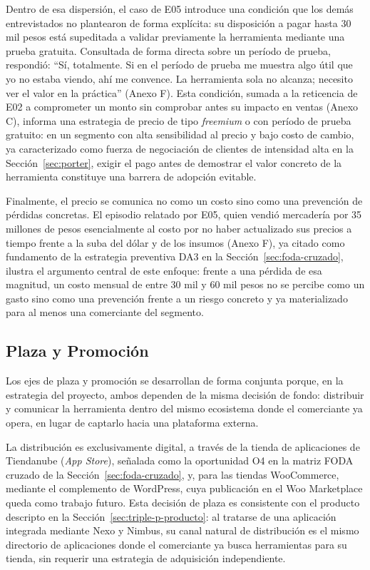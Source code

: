 Dentro de esa dispersión, el caso de E05 introduce una condición que los demás entrevistados no plantearon de forma explícita: su disposición a pagar hasta 30 mil pesos está supeditada a validar previamente la herramienta mediante una prueba gratuita. Consultada de forma directa sobre un período de prueba, respondió: \enquote{Sí, totalmente. Si en el período de prueba me muestra algo útil que yo no estaba viendo, ahí me convence. La herramienta sola no alcanza; necesito ver el valor en la práctica} (Anexo F). Esta condición, sumada a la reticencia de E02 a comprometer un monto sin comprobar antes su impacto en ventas (Anexo C), informa una estrategia de precio de tipo \emph{freemium} o con período de prueba gratuito: en un segmento con alta sensibilidad al precio y bajo costo de cambio, ya caracterizado como fuerza de negociación de clientes de intensidad alta en la Sección~\ref{sec:porter}, exigir el pago antes de demostrar el valor concreto de la herramienta constituye una barrera de adopción evitable.

Finalmente, el precio se comunica no como un costo sino como una prevención de pérdidas concretas. El episodio relatado por E05, quien vendió mercadería por 35 millones de pesos esencialmente al costo por no haber actualizado sus precios a tiempo frente a la suba del dólar y de los insumos (Anexo F), ya citado como fundamento de la estrategia preventiva DA3 en la Sección~\ref{sec:foda-cruzado}, ilustra el argumento central de este enfoque: frente a una pérdida de esa magnitud, un costo mensual de entre 30 mil y 60 mil pesos no se percibe como un gasto sino como una prevención frente a un riesgo concreto y ya materializado para al menos una comerciante del segmento.

\subsection{Plaza y Promoción}
\label{sec:triple-p-plaza-promocion}

Los ejes de plaza y promoción se desarrollan de forma conjunta porque, en la estrategia del proyecto, ambos dependen de la misma decisión de fondo: distribuir y comunicar la herramienta dentro del mismo ecosistema donde el comerciante ya opera, en lugar de captarlo hacia una plataforma externa.

La distribución es exclusivamente digital, a través de la tienda de aplicaciones de Tiendanube (\emph{App Store}), señalada como la oportunidad O4 en la matriz FODA cruzado de la Sección~\ref{sec:foda-cruzado}, y, para las tiendas WooCommerce, mediante el complemento de WordPress, cuya publicación en el Woo Marketplace queda como trabajo futuro. Esta decisión de plaza es consistente con el producto descripto en la Sección~\ref{sec:triple-p-producto}: al tratarse de una aplicación integrada mediante Nexo y Nimbus, su canal natural de distribución es el mismo directorio de aplicaciones donde el comerciante ya busca herramientas para su tienda, sin requerir una estrategia de adquisición independiente.

